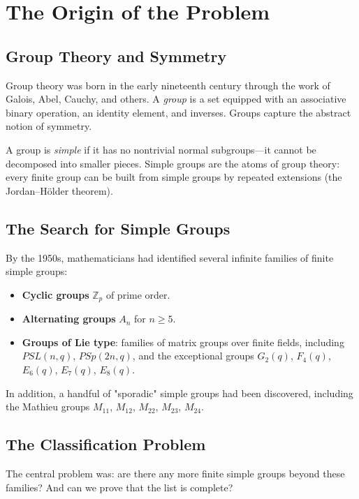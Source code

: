 \section{The Origin of the Problem}

\subsection{Group Theory and Symmetry}

Group theory was born in the early nineteenth century through the work of Galois, Abel, Cauchy, and others. A \emph{group} is a set equipped with an associative binary operation, an identity element, and inverses. Groups capture the abstract notion of symmetry.

A group is \emph{simple} if it has no nontrivial normal subgroups---it cannot be decomposed into smaller pieces. Simple groups are the atoms of group theory: every finite group can be built from simple groups by repeated extensions (the Jordan--H\"older theorem).

\subsection{The Search for Simple Groups}

By the 1950s, mathematicians had identified several infinite families of finite simple groups:

\begin{itemize}
\item \textbf{Cyclic groups} $\mathbb{Z}_p$ of prime order.
\item \textbf{Alternating groups} $A_n$ for $n \geq 5$.
\item \textbf{Groups of Lie type}: families of matrix groups over finite fields, including $PSL(n, q)$, $PSp(2n, q)$, and the exceptional groups $G_2(q)$, $F_4(q)$, $E_6(q)$, $E_7(q)$, $E_8(q)$.
\end{itemize}

In addition, a handful of "sporadic" simple groups had been discovered, including the Mathieu groups $M_{11}$, $M_{12}$, $M_{22}$, $M_{23}$, $M_{24}$.

\subsection{The Classification Problem}

The central problem was: are there any more finite simple groups beyond these families? And can we prove that the list is complete?

